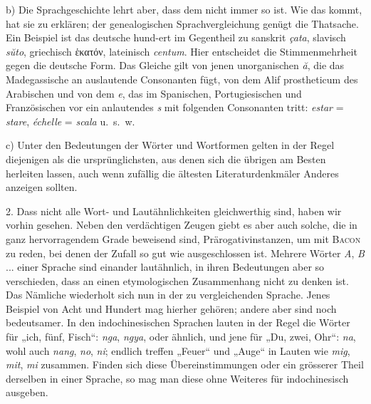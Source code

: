\label{III.I.I.2B1b}b) Die Sprachgeschichte lehrt aber, dass dem nicht immer so ist. Wie das kommt, hat sie zu erklären; der genealogischen Sprachvergleichung genügt die Thatsache. Ein Beispiel ist das deutsche hund-ert im Gegentheil zu sanskrit \textit{çata}, slavisch \textit{sŭto}, griechisch ἑκατόν, lateinisch \textit{centum}. Hier entscheidet die Stimmenmehrheit gegen die deutsche Form. Das Gleiche gilt von jenen unorganischen \textit{ă}, die das Madegassische an auslautende Consonanten fügt, von dem Alif prostheticum des Arabischen und von dem \textit{e}, das im Spanischen, Portugiesischen und Französischen vor ein anlautendes \textit{s} mit folgenden Consonanten tritt: \textit{estar} = \textit{stare}, \textit{échelle} = \textit{scala} u.~s.~w. 

\label{III.I.I.2B1c}c) Unter den Bedeutungen der Wörter und Wortformen gelten in der Regel diejenigen als die ursprünglichsten, aus denen sich die übrigen am Besten herleiten lassen, auch wenn zufällig die ältesten Literaturdenkmäler Anderes anzeigen sollten. 

\label{III.I.I.2B2}2. Dass nicht alle Wort- und Lautähnlichkeiten gleichwerthig sind, haben wir vorhin gesehen. Neben den verdächtigen Zeugen giebt es \label{fp.168} aber auch solche, \label{sp.158} die in ganz hervorragendem Grade beweisend sind, Prärogativinstanzen, um mit \textsc{Bacon} zu reden, bei denen der Zufall so gut wie ausgeschlossen ist. Mehrere Wörter \textit{A}, \textit{B} ... einer Sprache sind einander lautähnlich, in ihren Bedeutungen aber so verschieden, dass an einen etymologischen Zusammenhang nicht zu denken ist. Das Nämliche wiederholt sich nun in der zu vergleichenden Sprache. Jenes Beispiel von Acht und Hundert mag hierher gehören; andere aber sind noch bedeutsamer. In den indochinesischen Sprachen lauten in der Regel die Wörter für „ich, fünf, Fisch“: \textit{nga}, \textit{ngya}, oder ähnlich, und jene für „Du, zwei, Ohr“: \textit{na}, wohl auch \textit{nang}, \textit{no}, \textit{ni}; endlich treffen „Feuer“ und „Auge“ in Lauten wie \textit{mig}, \textit{mit}, \textit{mi} zusammen. Finden sich diese Übereinstimmungen oder ein grösserer Theil derselben in einer Sprache, so mag man diese ohne Weiteres für indochinesisch ausgeben.

